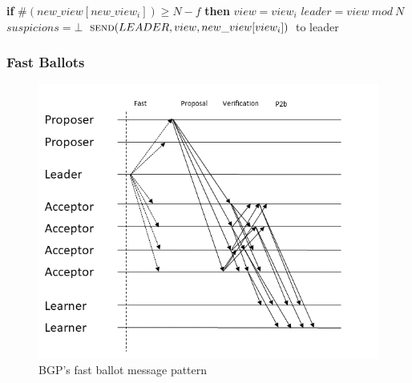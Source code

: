 \begin{algorithm}
\begin{algorithmic}[1]
		\State
		\State\hspace{\algorithmicindent} \textbf{if} $\#(new\_view[new\_view_i]) \geq N-f$ \textbf{then}
		\State\hspace{\algorithmicindent}\hspace{\algorithmicindent} $view = view_i$
		\State\hspace{\algorithmicindent}\hspace{\algorithmicindent} $leader = view\ mod\ N$
		\State\hspace{\algorithmicindent}\hspace{\algorithmicindent} $suspicions = \bot$
		\State\hspace{\algorithmicindent}\hspace{\algorithmicindent} $\Call{send}{LEADER, view, new\_view[view_i]}$ to leader
	\end{algorithmic}
\end{algorithm}

\subsubsection{Fast Ballots} 

\begin{figure}
	\centering
	\includegraphics[width=\textwidth*2/3]{Figures/bgp_fast}
	\caption{BGP's fast ballot message pattern}
	\label{bgp_fast}
\end{figure}

